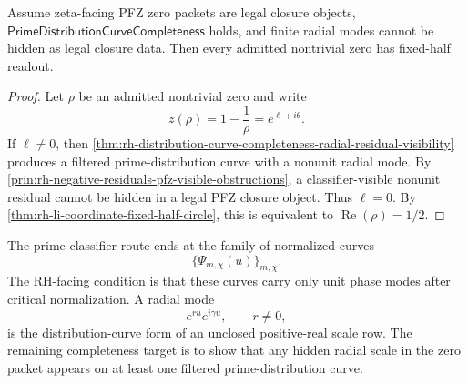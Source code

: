 \begin{corollary}
\label{cor:rh-prime-distribution-curve-conditional-fixed-half-readout}
Assume zeta-facing PFZ zero packets are legal closure objects,
$\mathsf{PrimeDistributionCurveCompleteness}$ holds, and finite radial
modes cannot be hidden as legal closure data.  Then every admitted
nontrivial zero has fixed-half readout.
\end{corollary}

\begin{proof}
Let $\rho$ be an admitted nontrivial zero and write
$$
z(\rho)=1-\frac1\rho=e^{\ell+i\theta}.
$$
If $\ell\ne0$, then
\autoref{thm:rh-distribution-curve-completeness-radial-residual-visibility}
produces a filtered prime-distribution curve with a nonunit radial mode.
By \autoref{prin:rh-negative-residuals-pfz-visible-obstructions}, a
classifier-visible nonunit residual cannot be hidden in a legal PFZ
closure object.  Thus $\ell=0$.  By
\autoref{thm:rh-li-coordinate-fixed-half-circle}, this is equivalent to
$\operatorname{Re}(\rho)=1/2$.
\end{proof}

\begin{principle}
\label{prin:rh-final-distribution-curve-target}
The prime-classifier route ends at the family of normalized curves
$$
\{\Psi_{m,\chi}(u)\}_{m,\chi}.
$$
The RH-facing condition is that these curves carry only unit phase modes
after critical normalization.  A radial mode
$$
e^{ru}e^{i\gamma u},
\qquad
r\ne0,
$$
is the distribution-curve form of an unclosed positive-real scale row.
The remaining completeness target is to show that any hidden radial
scale in the zero packet appears on at least one filtered
prime-distribution curve.
\end{principle}
